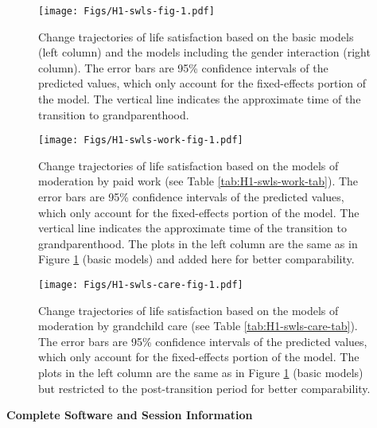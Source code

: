 \documentclass[
  english,
  man, noextraspace,floatsintext]{apa7}
\begin{document}
\begin{appendix}
\begin{figure}
\centering
\texttt{[image: Figs/H1-swls-fig-1.pdf]}
\caption{\label{fig:H1-swls-fig}Change trajectories of life satisfaction based on
the basic models (left column) and the models including the gender
interaction (right column). The error bars are 95\% confidence intervals
of the predicted values, which only account for the fixed-effects
portion of the model. The vertical line indicates the approximate time
of the transition to grandparenthood.}
\end{figure}










\begin{figure}
\centering
\texttt{[image: Figs/H1-swls-work-fig-1.pdf]}
\caption{\label{fig:H1-swls-work-fig}Change trajectories of life satisfaction
based on the models of moderation by paid work (see Table
\ref{tab:H1-swls-work-tab}). The error bars are 95\% confidence
intervals of the predicted values, which only account for the
fixed-effects portion of the model. The vertical line indicates the
approximate time of the transition to grandparenthood. The plots in the
left column are the same as in Figure \ref{fig:H1-swls-fig} (basic
models) and added here for better comparability.}
\end{figure}









\begin{figure}
\centering
\texttt{[image: Figs/H1-swls-care-fig-1.pdf]}
\caption{\label{fig:H1-swls-care-fig}Change trajectories of life satisfaction
based on the models of moderation by grandchild care (see Table
\ref{tab:H1-swls-care-tab}). The error bars are 95\% confidence
intervals of the predicted values, which only account for the
fixed-effects portion of the model. The plots in the left column are the
same as in Figure \ref{fig:H1-swls-fig} (basic models) but restricted to
the post-transition period for better comparability.}
\end{figure}

\newpage

\noindent  \textbf{Complete Software and Session Information}


\end{appendix}
\end{document}

